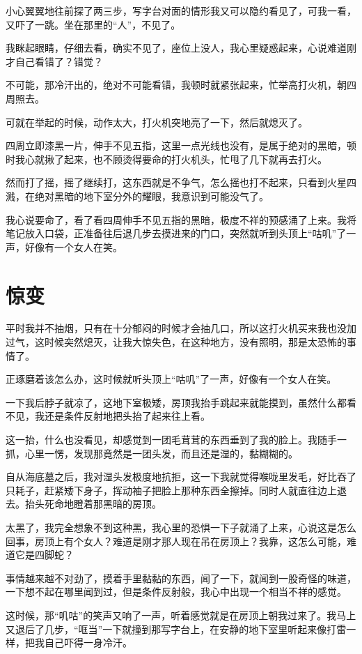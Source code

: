 小心翼翼地往前探了两三步，写字台对面的情形我又可以隐约看见了，可我一看，又吓了一跳。坐在那里的“人”，不见了。

我眯起眼睛，仔细去看，确实不见了，座位上没人，我心里疑惑起来，心说难道刚才自己看错了？错觉？

不可能，那冷汗出的，绝对不可能看错，我顿时就紧张起来，忙举高打火机，朝四周照去。

可就在举起的时候，动作太大，打火机突地亮了一下，然后就熄灭了。

四周立即漆黑一片，伸手不见五指，这里一点光线也没有，是属于绝对的黑暗，顿时我心就揪了起来，也不顾烫得要命的打火机头，忙甩了几下就再去打火。

然而打了摇，摇了继续打，这东西就是不争气，怎么摇也打不起来，只看到火星四溅，在绝对黑暗的地下室分外的耀眼，我意识到可能没气了。

我心说要命了，看了看四周伸手不见五指的黑暗，极度不祥的预感涌了上来。我将笔记放入口袋，正准备往后退几步去摸进来的门口，突然就听到头顶上“咕叽”了一声，好像有一个女人在笑。

\chapter{惊变}

平时我并不抽烟，只有在十分郁闷的时候才会抽几口，所以这打火机买来我也没加过气，这时候突然熄灭，让我大惊失色，在这种地方，没有照明，那是太恐怖的事情了。

正琢磨着该怎么办，这时候就听头顶上“咕叽”了一声，好像有一个女人在笑。

一下我后脖子就凉了，这地下室极矮，房顶我抬手跳起来就能摸到，虽然什么都看不见，我还是条件反射地把头抬了起来往上看。

这一抬，什么也没看见，却感觉到一团毛茸茸的东西垂到了我的脸上。我随手一抓，心里一愣，发现那竟然是一团头发，而且还是湿的，黏糊糊的。

自从海底墓之后，我对湿头发极度地抗拒，这一下我就觉得喉咙里发毛，好比吞了只耗子，赶紧矮下身子，挥动袖子把脸上那种东西全擦掉。同时人就直往边上退去。抬头死命地瞪着那黑暗的房顶。

太黑了，我完全想象不到这种黑，我心里的恐惧一下子就涌了上来，心说这是怎么回事，房顶上有个女人？难道是刚才那人现在吊在房顶上？我靠，这怎么可能，难道它是四脚蛇？

事情越来越不对劲了，摸着手里黏黏的东西，闻了一下，就闻到一股奇怪的味道，一下想不起在哪里闻到过，但是条件反射般，我心中出现一个相当不祥的感觉。

这时候，那“叽咕”的笑声又响了一声，听着感觉就是在房顶上朝我过来了。我马上又退后了几步，“哐当”一下就撞到那写字台上，在安静的地下室里听起来像打雷一样，把我自己吓得一身冷汗。

